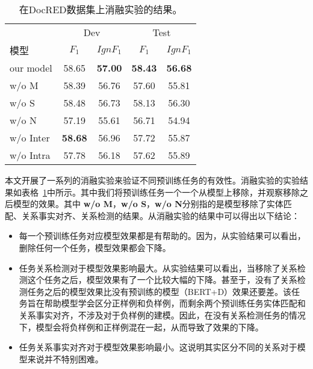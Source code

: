 \begin{table}
\centering
\begin{tabular}{lcccc}
\toprule
             & \multicolumn{2}{c}{Dev} & \multicolumn{2}{c}{Test} \\
模型        & $F_1$      & $IgnF_1$   & $F_1$      & $IgnF_1$      \\ \midrule
our model   & 58.65  & \textbf{57.00}  & \textbf{58.43}  & \textbf{56.68} \\
\midrule
\quad w/o M    & 58.39      & 56.76      & 57.60      & 55.81            \\
\quad w/o S    & 58.48      & 56.73      & 58.13      & 56.30            \\
\quad w/o N    & 57.19      & 55.61      & 56.71      & 54.94            \\ 
\midrule
\quad w/o Inter & \textbf{58.68}  & 56.96      & 57.72      & 55.87             \\
\quad w/o Intra & 57.78      & 56.18      & 57.62      & 55.89              \\
\bottomrule
\end{tabular}
\caption{在DocRED数据集上消融实验的结果。}
\label{ablation_study}
\end{table}

本文开展了一系列的消融实验来验证不同预训练任务的有效性。消融实验的实验结果如表格~\ref{ablation_study}中所示。其中我们将预训练任务一个一个从模型上移除，并观察移除之后模型的效果。其中 \textbf{w/o M}，\textbf{w/o S}，\textbf{w/o N}分别指的是模型移除了实体匹配、关系事实对齐、关系检测的结果。从消融实验的结果中可以得出以下结论：
\begin{itemize}
	\item 每一个预训练任务对应模型效果都是有帮助的。因为，从实验结果可以看出，删除任何一个任务，模型效果都会下降。
	\item 任务关系检测对于模型效果影响最大。从实验结果可以看出，当移除了关系检测这个任务之后，模型效果有了一个比较大幅的下降。甚至于，没有了关系检测任务之后的模型效果比没有预训练的模型（BERT+D）效果还要差。该任务旨在帮助模型学会区分正样例和负样例，而剩余两个预训练任务实体匹配和关系事实对齐，不涉及对于负样例的建模。因此，在没有关系检测任务的情况下，模型会将负样例和正样例混在一起，从而导致了效果的下降。
	\item 任务关系事实对齐对于模型效果影响最小。这说明其实区分不同的关系对于模型来说并不特别困难。
\end{itemize}

 \hspace*{\fill}
 
